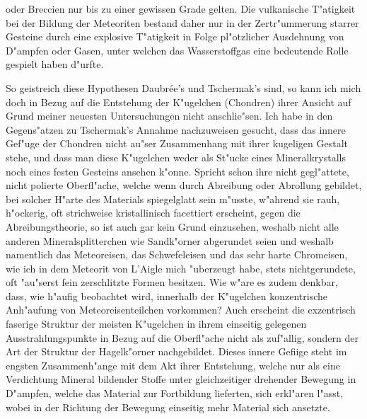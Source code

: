 \documentclass[a4paper, 11pt, oneside]{article}
\begin{document}
oder Breccien nur bis zu einer gewissen Grade gelten. Die vulkanische T"atigkeit bei der Bildung der Meteoriten bestand daher nur in der Zertr"ummerung starrer Gesteine durch eine explosive T"atigkeit in Folge pl"otzlicher Ausdehnung von D"ampfen oder Gasen, unter welchen das Wasserstoffgas eine bedeutende Rolle gespielt haben d"urfte.

So geistreich diese Hypothesen Daubrée's und Tschermak's sind, so kann ich mich doch in Bezug auf die Entstehung der K"ugelchen (Chondren) ihrer Ansicht auf Grund meiner neuesten Untersuchungen nicht anschlie"sen. Ich habe in den Gegens"atzen zu Tschermak's Annahme nachzuweisen gesucht, dass das innere Gef"uge der Chondren nicht au"ser Zusammenhang mit ihrer kugeligen Gestalt stehe, und dass man diese K"ugelchen weder als St"ucke eines Mineralkrystalls noch eines festen Gesteins ansehen k"onne. Spricht schon ihre nicht gegl"attete, nicht polierte Oberfl"ache, welche wenn durch Abreibung oder Abrollung gebildet, bei solcher H"arte des Materials spiegelglatt sein m"usste, w"ahrend sie rauh, h"ockerig, oft strichweise kristallinisch facettiert erscheint, gegen die Abreibungstheorie, so ist auch gar kein Grund einzusehen, weshalb nicht alle anderen Mineralsplitterchen wie Sandk"orner abgerundet seien und weshalb namentlich das Meteoreisen, das Schwefeleisen und das sehr harte Chromeisen, wie ich in dem Meteorit von L'Aigle mich "uberzeugt habe, stets nichtgerundete, oft "au"serst fein zerschlitzte Formen besitzen. Wie w"are es zudem denkbar, dass, wie h"aufig beobachtet wird, innerhalb der K"ugelchen konzentrische Anh"aufung von Meteoreisenteilchen vorkommen? Auch erscheint die exzentrisch faserige Struktur der meisten K"ugelchen in ihrem einseitig gelegenen Ausstrahlungspunkte in Bezug auf die Oberfl"ache nicht als zuf"allig, sondern der Art der Struktur der Hagelk"orner nachgebildet. Dieses innere Gefiige steht im engsten Zusammenh"ange mit dem Akt ihrer Entstehung, welche nur als eine Verdichtung Mineral bildender Stoffe unter gleichzeitiger drehender Bewegung in D"ampfen, welche das Material zur Fortbildung lieferten, sich erkl"aren l"asst, wobei in der Richtung der Bewegung einseitig mehr Material sich ansetzte.
\end{document}

